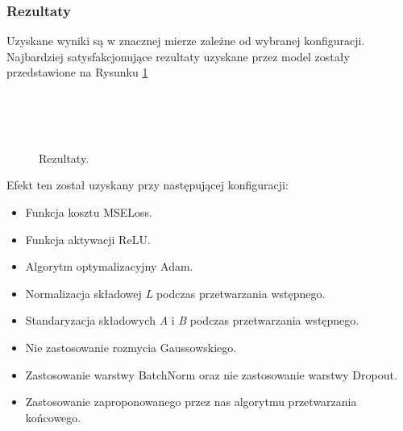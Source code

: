 \subsubsection{Rezultaty} \label{Rezultaty}

 Uzyskane wyniki są w znacznej mierze zależne od wybranej konfiguracji.
 Najbardziej satysfakcjonujące rezultaty uzyskane przez model zostały
 przedstawione na Rysunku \ref{fig:best_result}

 \begin{figure}[ht]
   \centering
    \\
    \\
    \\
   \caption[Efekty działania sieci - źródło: Rysunek własny bazujący na:
   \url{https://fr.m.wikipedia.org/wiki/Fichier:An_F-A-18C_Hornet_launches_from_the_flight_deck_of_the_conventionally_powered_aircraft_carrier.jpg},
   \url{https://pl.wikipedia.org/wiki/Plik:PL_Bagno_Calowanie_2.jpg}, \cite{cifar-10}]
   {Rezultaty.}
   \label{fig:best_result}
 \end{figure}

 \noindent
 Efekt ten został uzyskany przy następującej konfiguracji:
 \begin{itemize}
   \item Funkcja kosztu MSELoss.
   \item Funkcja aktywacji ReLU.
   \item Algorytm optymalizacyjny Adam.
   \item Normalizacja składowej \textit{L} podczas przetwarzania wstępnego.
   \item Standaryzacja składowych \textit{A} i \textit{B} podczas przetwarzania wstępnego.
   \item Nie zastosowanie rozmycia Gaussowskiego.
   \item Zastosowanie warstwy BatchNorm oraz nie zastosowanie warstwy Dropout.
   \item Zastosowanie zaproponowanego przez nas algorytmu przetwarzania końcowego.
 \end{itemize}

